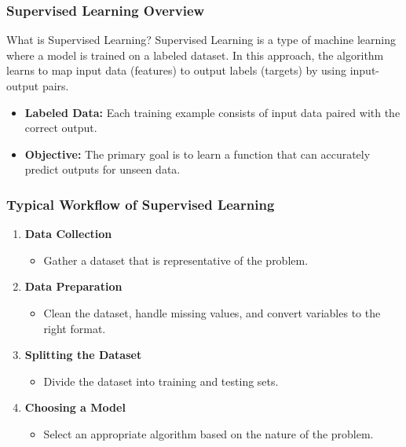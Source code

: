 \documentclass[aspectratio=169]{beamer}
\begin{document}
\begin{frame}[fragile]
    \frametitle{Supervised Learning Overview}
    \begin{block}{What is Supervised Learning?}
        Supervised Learning is a type of machine learning where a model is trained on a labeled dataset. 
        In this approach, the algorithm learns to map input data (features) to output labels (targets) by using input-output pairs.
    \end{block}
    \begin{itemize}
        \item \textbf{Labeled Data:} Each training example consists of input data paired with the correct output.
        \item \textbf{Objective:} The primary goal is to learn a function that can accurately predict outputs for unseen data.
    \end{itemize}
\end{frame}

\begin{frame}[fragile]
    \frametitle{Typical Workflow of Supervised Learning}
    \begin{enumerate}
        \item \textbf{Data Collection}
            \begin{itemize}
                \item Gather a dataset that is representative of the problem.
            \end{itemize}
        \item \textbf{Data Preparation}
            \begin{itemize}
                \item Clean the dataset, handle missing values, and convert variables to the right format.
            \end{itemize}
        \item \textbf{Splitting the Dataset}
            \begin{itemize}
                \item Divide the dataset into training and testing sets.
            \end{itemize}
        \item \textbf{Choosing a Model}
            \begin{itemize}
                \item Select an appropriate algorithm based on the nature of the problem.
            \end{itemize}
    \end{enumerate}
\end{frame}
\end{document}
